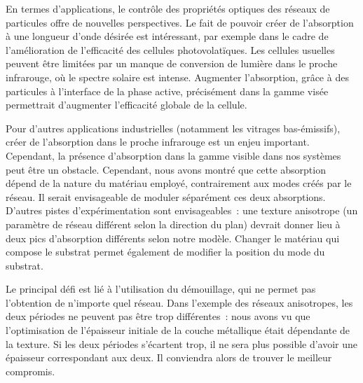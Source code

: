 En termes d'applications, le contrôle des propriétés optiques des réseaux de particules offre de nouvelles perspectives. Le fait de pouvoir créer de l'absorption à une longueur d'onde désirée est intéressant, par exemple dans le cadre de l'amélioration de l'efficacité des cellules photovolatïques. Les cellules usuelles peuvent être limitées par un manque de conversion de lumière dans le proche infrarouge, où le spectre solaire est intense. Augmenter l'absorption, grâce à des particules à l'interface de la phase active, précisément dans la gamme visée permettrait d'augmenter l'efficacité globale de la cellule.\par 
Pour d'autres applications industrielles (notamment les vitrages bas-émissifs), créer de l'absorption dans le proche infrarouge est un enjeu important. Cependant, la présence d'absorption dans la gamme visible dans nos systèmes peut être un obstacle. Cependant, nous avons montré que cette absorption dépend de la nature du matériau employé, contrairement aux modes créés par le réseau. Il serait envisageable de moduler séparément ces deux absorptions. D'autres pistes d'expérimentation sont envisageables~: une texture anisotrope (un paramètre de réseau différent selon la direction du plan) devrait donner lieu à deux pics d'absorption différents selon notre modèle. Changer le matériau qui compose le substrat permet également de modifier la position du mode du substrat.\par 
Le principal défi est lié à l'utilisation du démouillage, qui ne permet pas l'obtention de n'importe quel réseau. Dans l'exemple des réseaux anisotropes, les deux périodes ne peuvent pas être trop différentes~: nous avons vu que l'optimisation de l'épaisseur initiale de la couche métallique était dépendante de la texture. Si les deux périodes s'écartent trop, il ne sera plus possible d'avoir une épaisseur correspondant aux deux. Il conviendra alors de trouver le meilleur compromis.\par 


\newpage


